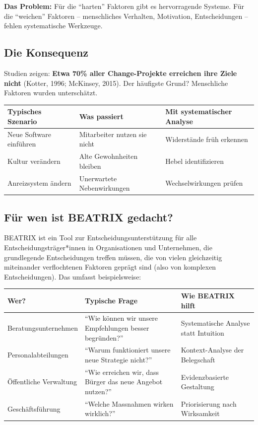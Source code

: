 \documentclass[11pt,a4paper]{article}
\begin{document}
\textbf{Das Problem:} Für die ``harten'' Faktoren gibt es hervorragende Systeme. Für die ``weichen'' Faktoren -- menschliches Verhalten, Motivation, Entscheidungen -- fehlen systematische Werkzeuge.

\subsection{Die Konsequenz}

Studien zeigen: \textbf{Etwa 70\% aller Change-Projekte erreichen ihre Ziele nicht} (Kotter, 1996; McKinsey, 2015). Der häufigste Grund? Menschliche Faktoren wurden unterschätzt.

\begin{table}[h]
\centering
\begin{tabular}{@{}L{4cm}L{4cm}L{5cm}@{}}
\toprule
\textbf{Typisches Szenario} & \textbf{Was passiert} & \textbf{Mit systematischer Analyse} \\
\midrule
Neue Software einführen & Mitarbeiter nutzen sie nicht & Widerstände früh erkennen \\
Kultur verändern & Alte Gewohnheiten bleiben & Hebel identifizieren \\
Anreizsystem ändern & Unerwartete Nebenwirkungen & Wechselwirkungen prüfen \\
\bottomrule
\end{tabular}
\end{table}

\subsection{Für wen ist BEATRIX gedacht?}

BEATRIX ist ein Tool zur Entscheidungsunterstützung für alle Entscheidungsträger*innen in Organisationen und Unternehmen, die grundlegende Entscheidungen treffen müssen, die von vielen gleichzeitig miteinander verflochtenen Faktoren geprägt sind (also von komplexen Entscheidungen). Das umfasst beispielsweise:

\begin{table}[h]
\centering
\begin{tabular}{@{}L{3.5cm}L{4.5cm}L{5cm}@{}}
\toprule
\textbf{Wer?} & \textbf{Typische Frage} & \textbf{Wie BEATRIX hilft} \\
\midrule
Beratungsunternehmen & ``Wie können wir unsere Empfehlungen besser begründen?'' & Systematische Analyse statt Intuition \\
Personalabteilungen & ``Warum funktioniert unsere neue Strategie nicht?'' & Kontext-Analyse der Belegschaft \\
Öffentliche Verwaltung & ``Wie erreichen wir, dass Bürger das neue Angebot nutzen?'' & Evidenzbasierte Gestaltung \\
Geschäftsführung & ``Welche Massnahmen wirken wirklich?'' & Priorisierung nach Wirksamkeit \\
\bottomrule
\end{tabular}
\end{table}
\end{document}
